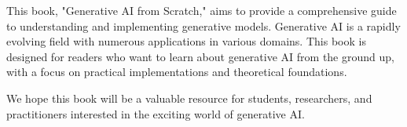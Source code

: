 This book, "Generative AI from Scratch," aims to provide a comprehensive guide to understanding and implementing generative models. Generative AI is a rapidly evolving field with numerous applications in various domains. This book is designed for readers who want to learn about generative AI from the ground up, with a focus on practical implementations and theoretical foundations.

We hope this book will be a valuable resource for students, researchers, and practitioners interested in the exciting world of generative AI.

